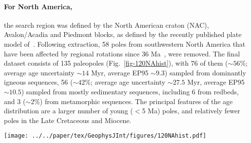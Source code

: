 \paragraph{For North America,}
the search region was defined by the North American craton (NAC), Avalon/Acadia
and Piedmont blocks, as defined by the recently published plate model
of~\citet{Y18}. Following extraction, 58 poles from southwestern North America
that have been affected by regional rotations since 36 Ma~\citep{Mc06}, were
removed. The final dataset consists of 135 paleopoles (Fig.~\ref{fig-120NAhist}),
with 76 of them (${\sim}56$\%; average age uncertainty ${\sim}14$ Myr, average
EP95 ${\sim}9.3$\degree) sampled from dominantly igneous sequences, 56
(${\sim}42$\%; average age uncertainty ${\sim}27.5$ Myr, average EP95 ${\sim}10.5$\degree)
sampled from mostly sedimentary sequences, including 6 from redbeds, and 3
(${\sim}2$\%) from metamorphic sequences. The principal features of the age
distribution are a larger number of young ($<$5 Ma) poles, and relatively fewer
poles in the Late Cretaceous and Miocene.

\begin{figure*}
\centering
\texttt{[image: ../../paper/tex/GeophysJInt/figures/120NAhist.pdf]}
\caption[Distribution of 120 Ma North American poles]{Temporal
distribution of 120 Ma $NAC$ paleopoles in 10 Myr window
length and 5 Myr step length. For distribution a, each bin only counts in the
midpoints (circles) of pole uncertainty bars (not including those right at bin edges);
For distribution b, as long as the bar intersects with the bin (not including
those intersecting only at one of bin edges), it is counted in. Inside the
parentheses, i means igneous rocks derived (red bars; only two poles,
83 Ma and 80 Ma, from igneous and also sedimentary;
only one pole, 72 Ma, from igneous and also metamorphic), r means
sedimentary rocks with redbeds involved derived (orange bars), and m means
metamorphic rocks derived (blue bars); the left are non-redbed sedimentary rocks
derived (black bars; only two poles, 146 Ma [RESULTNO 6679] and
2 Ma [RESULTNO 1227], are from sedimentary and also metamorphic).
The data published before 1984 are shown as circles with a
dot.}\label{fig-120NAhist}
\end{figure*}

